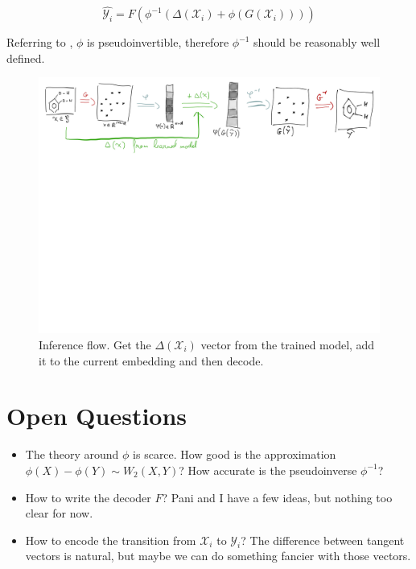 \documentclass{article}
\begin{document}
\[\hat{\mathcal{Y}_i} = F\left(\phi^{-1}\left(\Delta(\mathcal{X}_i) + \phi\left(G(\mathcal{X}_i)\right)\right)\right)\]

Referring to \cite{kolouri2020wasserstein}, $\phi$ is pseudoinvertible, therefore $\phi^{-1}$ should be reasonably well defined.

\begin{figure}[h!t]
    \label{fig:infer}
    \begin{center}
        \includegraphics[page=2,width=\textwidth, trim=0 40cm 0 0 ,clip,angle=0]{images/model_outline_infer.png}
        \caption{Inference flow. Get the $\Delta(\mathcal{X}_i)$ vector from the trained model, add it to the current embedding and then decode.}
    \end{center}
\end{figure}

\section{Open Questions}
\begin{itemize}
    \item The theory around $\phi$ is scarce. How good is the approximation $\phi(X) - \phi(Y)\sim W_2(X,Y)$? How accurate is the pseudoinverse $\phi^{-1}$?
    \item How to write the decoder $F$? Pani and I have a few ideas, but nothing too clear for now.
    \item How to encode the transition from $\mathcal{X}_i$ to $\mathcal{Y}_i$? The difference between tangent vectors is natural, but maybe we can do something fancier with those vectors.
\end{itemize}



\end{document}

